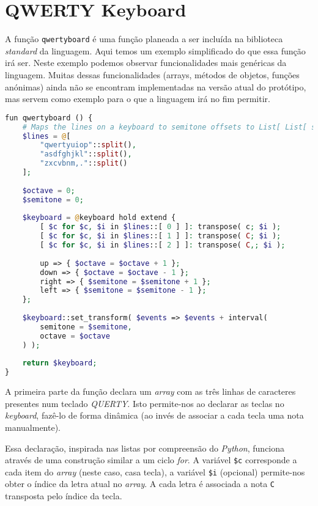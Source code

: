 \section{QWERTY Keyboard}
A função \texttt{qwertyboard} é uma função planeada a ser incluída na biblioteca \textit{standard} da linguagem. Aqui temos um exemplo simplificado do que essa função irá ser.
Neste exemplo podemos observar funcionalidades mais genéricas da linguagem. Muitas dessas funcionalidades (arrays, métodos de objetos, funções anónimas) ainda não se encontram implementadas na versão atual do protótipo, mas servem como exemplo para o que a linguagem irá no fim permitir.
\begin{lstlisting}[caption=Exemplo da sintaxe proposta da linguagem,language=PHP]
fun qwertyboard () {
    # Maps the lines on a keyboard to semitone offsets to List[ List[ str ] ]
    $lines = @[
        "qwertyuiop"::split(),
        "asdfghjkl"::split(),
        "zxcvbnm,."::split()
    ];
    
    $octave = 0;
    $semitone = 0;
    
    $keyboard = @keyboard hold extend {
        [ $c for $c, $i in $lines::[ 0 ] ]: transpose( c; $i );
        [ $c for $c, $i in $lines::[ 1 ] ]: transpose( C; $i ); 
        [ $c for $c, $i in $lines::[ 2 ] ]: transpose( C,; $i );
        
        up => { $octave = $octave + 1 };
        down => { $octave = $octave - 1 };
        right => { $semitone = $semitone + 1 };
        left => { $semitone = $semitone - 1 };
    };
    
    $keyboard::set_transform( $events => $events + interval( 
        semitone = $semitone, 
        octave = $octave 
    ) );
    
    return $keyboard;
}
\end{lstlisting}
A primeira parte da função declara um \textit{array} com as três linhas de caracteres presentes num teclado \textit{QUERTY}. Isto permite-nos ao declarar as teclas no \textit{keyboard}, fazê-lo de forma dinâmica (ao invés de associar a cada tecla uma nota manualmente).

Essa declaração, inspirada nas listas por compreensão do \textit{Python}, funciona através de uma construção similar a um ciclo \textit{for}. A variável \texttt{\$c} corresponde a cada item do \textit{array} (neste caso, casa tecla), a variável \texttt{\$i} (opcional) permite-nos obter o índice da letra atual no \textit{array}. A cada letra é associada a nota \texttt{C} transposta pelo índice da tecla.


